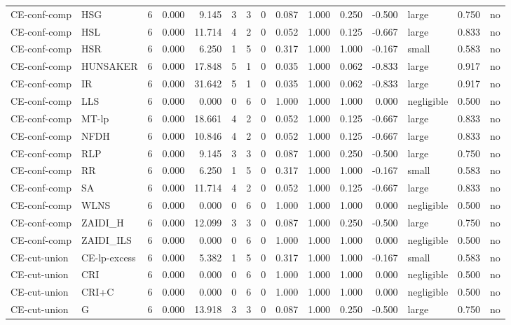 \begin{table}[htbp]
\begin{tabular}{llrrrrrrrrrrlrr}
CE-conf-comp & HSG & 6 & 0.000 & 9.145 & 3 & 3 & 0 & 0.087 & 1.000 & 0.250 & -0.500 & large & 0.750 & no \\
CE-conf-comp & HSL & 6 & 0.000 & 11.714 & 4 & 2 & 0 & 0.052 & 1.000 & 0.125 & -0.667 & large & 0.833 & no \\
CE-conf-comp & HSR & 6 & 0.000 & 6.250 & 1 & 5 & 0 & 0.317 & 1.000 & 1.000 & -0.167 & small & 0.583 & no \\
CE-conf-comp & HUNSAKER & 6 & 0.000 & 17.848 & 5 & 1 & 0 & 0.035 & 1.000 & 0.062 & -0.833 & large & 0.917 & no \\
CE-conf-comp & IR & 6 & 0.000 & 31.642 & 5 & 1 & 0 & 0.035 & 1.000 & 0.062 & -0.833 & large & 0.917 & no \\
CE-conf-comp & LLS & 6 & 0.000 & 0.000 & 0 & 6 & 0 & 1.000 & 1.000 & 1.000 & 0.000 & negligible & 0.500 & no \\
CE-conf-comp & MT-lp & 6 & 0.000 & 18.661 & 4 & 2 & 0 & 0.052 & 1.000 & 0.125 & -0.667 & large & 0.833 & no \\
CE-conf-comp & NFDH & 6 & 0.000 & 10.846 & 4 & 2 & 0 & 0.052 & 1.000 & 0.125 & -0.667 & large & 0.833 & no \\
CE-conf-comp & RLP & 6 & 0.000 & 9.145 & 3 & 3 & 0 & 0.087 & 1.000 & 0.250 & -0.500 & large & 0.750 & no \\
CE-conf-comp & RR & 6 & 0.000 & 6.250 & 1 & 5 & 0 & 0.317 & 1.000 & 1.000 & -0.167 & small & 0.583 & no \\
CE-conf-comp & SA & 6 & 0.000 & 11.714 & 4 & 2 & 0 & 0.052 & 1.000 & 0.125 & -0.667 & large & 0.833 & no \\
CE-conf-comp & WLNS & 6 & 0.000 & 0.000 & 0 & 6 & 0 & 1.000 & 1.000 & 1.000 & 0.000 & negligible & 0.500 & no \\
CE-conf-comp & ZAIDI\_H & 6 & 0.000 & 12.099 & 3 & 3 & 0 & 0.087 & 1.000 & 0.250 & -0.500 & large & 0.750 & no \\
CE-conf-comp & ZAIDI\_ILS & 6 & 0.000 & 0.000 & 0 & 6 & 0 & 1.000 & 1.000 & 1.000 & 0.000 & negligible & 0.500 & no \\
CE-cut-union & CE-lp-excess & 6 & 0.000 & 5.382 & 1 & 5 & 0 & 0.317 & 1.000 & 1.000 & -0.167 & small & 0.583 & no \\
CE-cut-union & CRI & 6 & 0.000 & 0.000 & 0 & 6 & 0 & 1.000 & 1.000 & 1.000 & 0.000 & negligible & 0.500 & no \\
CE-cut-union & CRI+C & 6 & 0.000 & 0.000 & 0 & 6 & 0 & 1.000 & 1.000 & 1.000 & 0.000 & negligible & 0.500 & no \\
CE-cut-union & G & 6 & 0.000 & 13.918 & 3 & 3 & 0 & 0.087 & 1.000 & 0.250 & -0.500 & large & 0.750 & no \\

\end{tabular}
\end{table}
